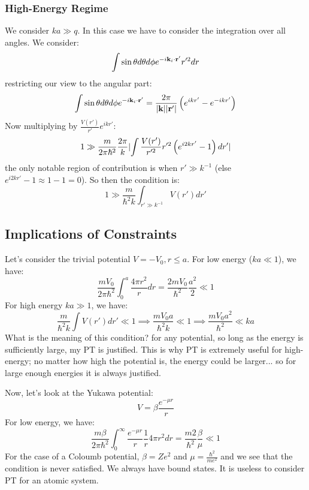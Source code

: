 \subsubsection{High-Energy Regime}
We consider $ka \gg q$. In this case we have to consider the integration over all angles. We consider:
\begin{equation}
    \int \sin\theta d\theta d\phi e^{-i\v{k}_i \cdot \v{r}'}r'^2 dr
\end{equation}
restricting our view to the angular part:
\begin{equation}
    \int \sin\theta d\theta d\phi e^{-i\v{k}_i \cdot \v{r}'} = \frac{2\pi}{\abs{\v{k}}\abs{\v{r}'}} \left(e^{ikr'} - e^{-ikr'}\right)
\end{equation}
Now multiplying by $\frac{V(r')}{r'}e^{ikr'}$:
\begin{equation}
    1 \gg \frac{m}{2\pi\hbar^2}\frac{2\pi}{k}\lvert \int \frac{V(r')}{r'^2}r'^2\left(e^{i2kr'} - 1\right)dr' \rvert
\end{equation}
the only notable region of contribution is when $r' \gg k^{-1}$ (else $e^{i2kr'} - 1 \approx  1- 1 = 0$). So then the condition is:
\begin{equation}
    1 \gg \frac{m}{\hbar^2 k}\int_{r' \gg k^{-1}} V(r')dr'
\end{equation}

\subsection{Implications of Constraints}
Let's consider the trivial potential $V = -V_0, r \leq a$. For low energy ($ka \ll 1$), we have:
\begin{equation}
    \frac{mV_0}{2\pi \hbar^2} \int_0^a \frac{4\pi r^2}{r}dr = \frac{2m V_0}{\hbar^2}\frac{a^2}{2} \ll 1
\end{equation}
For high energy $ka \gg 1$, we have:
\begin{equation}
    \frac{m}{\hbar^2 k}\int V(r')dr' \ll 1 \implies \frac{mV_0 a}{\hbar^2 k} \ll 1 \implies \frac{mV_0 a^2}{\hbar^2} \ll ka
\end{equation}
What is the meaning of this condition? for any potential, so long as the energy is sufficiently large, my PT is justified. This is why PT is extremely useful for high-energy; no matter how high the potential is, the energy could be larger... so for large enough energies it is always justified.

Now, let's look at the Yukawa potential:
\begin{equation}
    V = \beta \frac{e^{-\mu r}}{r}
\end{equation}
For low energy, we have:
\begin{equation}
    \frac{m\beta}{2\pi \hbar^2}\int_0^{\infty}\frac{e^{-\mu r}}{r}\frac{1}{r}4\pi r^2 dr = \frac{m2}{\hbar^2}\frac{\beta}{\mu} \ll 1
\end{equation}
For the case of a Coloumb potential, $\beta = Ze^2$ and $\mu = \frac{\hbar^2}{me^2}$ and we see that the condition is never satisfied. We always have bound states. It is useless to consider PT for an atomic system. 

